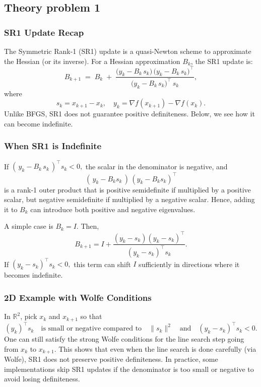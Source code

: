\documentclass[a4paper,12pt]{article}
\begin{document}
\subsection{Theory problem 1}
\subsubsection*{SR1 Update Recap}
The Symmetric Rank-1 (SR1) update is a quasi-Newton scheme to approximate the Hessian (or its inverse). For a Hessian approximation $B_k$, the SR1 update is:
\[
  B_{k+1} 
  \;=\; 
  B_k 
  \;+\;
  \frac{\bigl(y_k - B_k \, s_k \bigr)\,\bigl(y_k - B_k \, s_k \bigr)^\top}
       {\bigl(y_k - B_k \, s_k \bigr)^\top \, s_k},
\]
where 
\[
  s_k = x_{k+1} - x_k, 
  \quad
  y_k = \nabla f(x_{k+1}) - \nabla f(x_k).
\]
Unlike BFGS, SR1 does not guarantee positive definiteness. Below, we see how it can become indefinite.

\subsubsection*{When SR1 is Indefinite}
If $(\,y_k - B_k\,s_k\,)^\top s_k < 0,$ the scalar in the denominator is negative, and
\[
  (\,y_k - B_k s_k\,)\,(y_k - B_k s_k)^\top
\]
is a rank-1 outer product that is positive semidefinite if multiplied by a positive scalar, but negative semidefinite if multiplied by a negative scalar. Hence, adding it to $B_k$ can introduce both positive and negative eigenvalues.  
\par
A simple case is $B_k = I$. Then,
\[
  B_{k+1} 
  = 
  I 
  + 
  \frac{(y_k - s_k)(y_k - s_k)^\top}{(y_k - s_k)^\top s_k}.
\]
If $(y_k - s_k)^\top s_k < 0,$ this term can shift $I$ sufficiently in directions where it becomes indefinite.  

\subsubsection*{2D Example with Wolfe Conditions}
In $\mathbb{R}^2$, pick $x_k$ and $x_{k+1}$ so that
\[
  (y_k)^\top s_k
  \quad
  \text{is small or negative compared to}
  \quad
  \|s_k\|^2
  \quad
  \text{and}
  \quad
  (y_k - s_k)^\top s_k<0.
\]
One can still satisfy the strong Wolfe conditions for the line search step going from $x_k$ to $x_{k+1}$. This shows that even when the line search is done carefully (via Wolfe), SR1 does not preserve positive definiteness. In practice, some implementations skip SR1 updates if the denominator is too small or negative to avoid losing definiteness.
\end{document}
